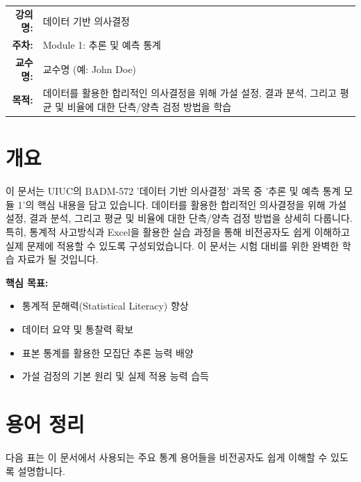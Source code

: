 \documentclass[11pt,a4paper]{book}
\makeatletter
\theoremstyle{definition}
\newcommand{\metainfo}[4]{
\begin{tcolorbox}[
    colback=lightpurple,
    colframe=darkpurple,
    boxrule=1pt,
    arc=2mm,
    left=10pt,
    right=10pt,
    top=8pt,
    bottom=8pt
]
\begin{tabular}{@{}rl@{}}
\textbf{강의명:} & #1 \\[0.3em]
\textbf{주차:} & #2 \\[0.3em]
\textbf{교수명:} & #3 \\[0.3em]
\textbf{목적:} & \begin{minipage}[t]{0.75\textwidth}#4\end{minipage}
\end{tabular}
\end{tcolorbox}
}
\makeatother
\begin{document}
\metainfo{데이터 기반 의사결정}{Module 1: 추론 및 예측 통계}{교수명 (예: John Doe)}{데이터를 활용한 합리적인 의사결정을 위해 가설 설정, 결과 분석, 그리고 평균 및 비율에 대한 단측/양측 검정 방법을 학습}


\section*{개요}
이 문서는 UIUC의 BADM-572 '데이터 기반 의사결정' 과목 중 '추론 및 예측 통계 모듈 1'의 핵심 내용을 담고 있습니다.
데이터를 활용한 합리적인 의사결정을 위해 가설 설정, 결과 분석, 그리고 평균 및 비율에 대한 단측/양측 검정 방법을 상세히 다룹니다.
특히, 통계적 사고방식과 Excel을 활용한 실습 과정을 통해 비전공자도 쉽게 이해하고 실제 문제에 적용할 수 있도록 구성되었습니다.
이 문서는 시험 대비를 위한 완벽한 학습 자료가 될 것입니다.

\vspace{1em}

\begin{summarybox}
\textbf{핵심 목표:}
\begin{itemize}
    \item 통계적 문해력(Statistical Literacy) 향상
    \item 데이터 요약 및 통찰력 확보
    \item 표본 통계를 활용한 모집단 추론 능력 배양
    \item 가설 검정의 기본 원리 및 실제 적용 능력 습득
\end{itemize}
\end{summarybox}


\section*{용어 정리}

다음 표는 이 문서에서 사용되는 주요 통계 용어들을 비전공자도 쉽게 이해할 수 있도록 설명합니다.
\end{document}
